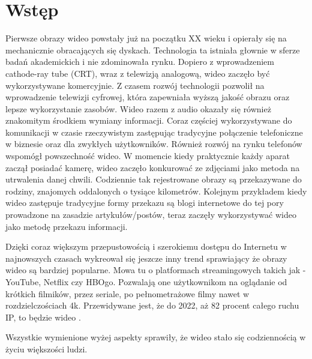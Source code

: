 \chapter{Wstęp}
\label{cha:pierwszyDokument}


Pierwsze obrazy wideo powstały już na początku XX wieku i opierały się na mechanicznie obracających się dyskach. Technologia ta istniała głownie w sferze badań akademickich i nie zdominowała rynku. Dopiero z wprowadzeniem cathode-ray tube (CRT), wraz z telewizją analogową, wideo zaczęło być wykorzystywane komercyjnie. Z czasem rozwój technologii pozwolił na wprowadzenie telewizji cyfrowej, która zapewniała wyższą jakość obrazu oraz lepsze wykorzystanie zasobów. Wideo razem z audio okazały się również znakomitym środkiem wymiany informacji. Coraz częściej wykorzystywane do komunikacji w czasie rzeczywistym zastępując tradycyjne połączenie telefoniczne w biznesie oraz dla zwykłych użytkowników. Również rozwój na rynku telefonów wspomógł powszechność wideo. W momencie kiedy praktycznie każdy aparat zaczął posiadać kamerę, wideo zaczęło konkurować ze zdjęciami jako metoda na utrwalenia danej chwili. Codziennie tak rejestrowane obrazy są przekazywane do rodziny, znajomych oddalonych o tysiące kilometrów. Kolejnym przykładem kiedy wideo zastępuje tradycyjne formy przekazu są blogi internetowe do tej pory prowadzone na zasadzie artykułów/postów, teraz zaczęły wykorzystywać wideo jako metodę przekazu informacji.

Dzięki coraz większym przepustowością i szerokiemu dostępu do Internetu w najnowszych czasach wykreował się jeszcze inny trend sprawiający że obrazy wideo są bardziej popularne. Mowa tu o platformach streamingowych takich jak - YouTube, Netflix czy HBOgo. Pozwalają one użytkownikom na oglądanie od krótkich filmików, przez seriale, po pełnometrażowe filmy nawet w rozdzielczościach 4k. Przewidywane jest, że do 2022, aż 82 procent całego ruchu IP, to będzie wideo \cite{prediction}. \par


Wszystkie wymienione wyżej aspekty sprawiły, że wideo stało się codziennością w życiu większości ludzi.\par

